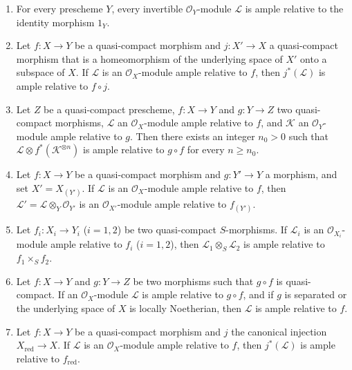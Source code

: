 \begin{proposition}[4.6.13]
\label{II.4.6.13}
\begin{enumerate}
  \item[\rm{(i)}] For every prescheme $Y$, every invertible
  $\mathcal{O}_Y$-module $\mathcal{L}$ is ample relative
  to the identity morphism $1_Y$.
  \item[\rm{(i \textit{bis})}] Let $f:X\to Y$ be a quasi-compact morphism and
  $j:X'\to X$ a quasi-compact morphism that is a homeomorphism of
  the underlying space of $X'$ onto a subspace of $X$. If $\mathcal{L}$
  is an $\mathcal{O}_X$-module ample relative to $f$, then
  $j^*(\mathcal{L})$ is ample relative to $f\circ j$.
  \item[\rm{(ii)}] Let $Z$ be a quasi-compact prescheme, $f:X\to Y$ and
  $g:Y\to Z$ two quasi-compact morphisms, $\mathcal{L}$ an
  $\mathcal{O}_X$-module ample relative to $f$, and $\mathcal{K}$ an
  $\mathcal{O}_Y$-module ample relative to $g$. Then there exists an
  integer $n_0>0$ such that
  $\mathcal{L}\otimes f^*(\mathcal{K}^{\otimes n})$ is ample relative
  to $g\circ f$ for every $n\geq n_0$.
  \item[\rm{(iii)}] Let $f:X\to Y$ be a quasi-compact morphism and
  $g:Y'\to Y$ a morphism, and set $X'=X_{(Y')}$. If $\mathcal{L}$ is
  an $\mathcal{O}_X$-module ample relative to $f$, then
  $\mathcal{L}'=\mathcal{L}\otimes_Y\mathcal{O}_{Y'}$ is an
  $\mathcal{O}_{X'}$-module ample relative to $f_{(Y')}$.
  \item[\rm{(iv)}] Let $f_i:X_i\to Y_i$ ($i=1,2$) be two quasi-compact
  $S$-morphisms. If $\mathcal{L}_i$ is an
  $\mathcal{O}_{X_i}$-module ample relative to $f_i$ ($i=1,2$), then
  $\mathcal{L}_1\otimes_S\mathcal{L}_2$ is ample relative to
  $f_1\times_S f_2$.
  \item[\rm{(v)}] Let $f:X\to Y$ and $g:Y\to Z$ be two morphisms such that
  $g\circ f$ is quasi-compact. If an $\mathcal{O}_X$-module
  $\mathcal{L}$ is ample relative to $g\circ f$, and if $g$ is separated
  or the underlying space of $X$ is locally Noetherian, then $\mathcal{L}$
  is ample relative to $f$.


  \item[\rm{(vi)}] Let $f:X\to Y$ be a quasi-compact morphism and $j$
  the canonical injection $X_{\mathrm{red}}\to X$. If $\mathcal{L}$ is an
  $\mathcal{O}_X$-module ample relative to $f$, then
  $j^*(\mathcal{L})$ is ample relative to $f_{\mathrm{red}}$.
\end{enumerate}
\end{proposition}

